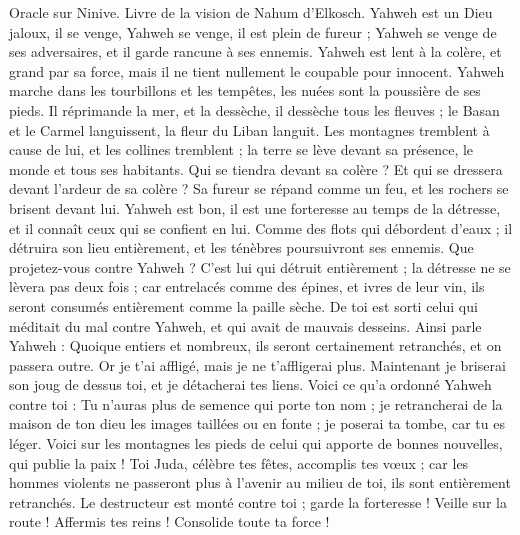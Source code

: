 \begin{multicols}{2}
\VerseOne{}Oracle sur Ninive. Livre de la vision de Nahum d’Elkosch.
Yahweh est un Dieu jaloux, il se venge, Yahweh se venge, il est plein de fureur ; Yahweh se venge de ses adversaires, et il garde rancune à ses ennemis.
Yahweh est lent à la colère, et grand par sa force, mais il ne tient nullement le coupable pour innocent. Yahweh marche dans les tourbillons et les tempêtes, les nuées sont la poussière de ses pieds.
Il réprimande la mer, et la dessèche, il dessèche tous les fleuves ; le Basan et le Carmel languissent, la fleur du Liban languit.
Les montagnes tremblent à cause de lui, et les collines tremblent ; la terre se lève devant sa présence, le monde et tous ses habitants.
Qui se tiendra devant sa colère ? Et qui se dressera devant l'ardeur de sa colère ? Sa fureur se répand comme un feu, et les rochers se brisent devant lui.
Yahweh est bon, il est une forteresse au temps de la détresse, et il connaît ceux qui se confient en lui.
Comme des flots qui débordent d'eaux ; il détruira son lieu entièrement, et les ténèbres poursuivront ses ennemis.
Que projetez-vous contre Yahweh ? C'est lui qui détruit entièrement ; la détresse ne se lèvera pas deux fois ;
car entrelacés comme des épines, et ivres de leur vin, ils seront consumés entièrement comme la paille sèche.
De toi est sorti celui qui méditait du mal contre Yahweh, et qui avait de mauvais desseins.
Ainsi parle Yahweh : Quoique entiers et nombreux, ils seront certainement retranchés, et on passera outre. Or je t'ai affligé, mais je ne t'affligerai plus.
Maintenant je briserai son joug de dessus toi, et je détacherai tes liens.
Voici ce qu’a ordonné Yahweh contre toi : Tu n’auras plus de semence qui porte ton nom ; je retrancherai de la maison de ton dieu les images taillées ou en fonte ; je poserai ta tombe, car tu es léger.
\VerseOne{}Voici sur les montagnes les pieds de celui qui apporte de bonnes nouvelles, qui publie la paix ! Toi Juda, célèbre tes fêtes, accomplis tes vœux ; car les hommes violents ne passeront plus à l'avenir au milieu de toi, ils sont entièrement retranchés.
Le destructeur est monté contre toi ; garde la forteresse ! Veille sur la route ! Affermis tes reins ! Consolide toute ta force !

\end{multicols}
